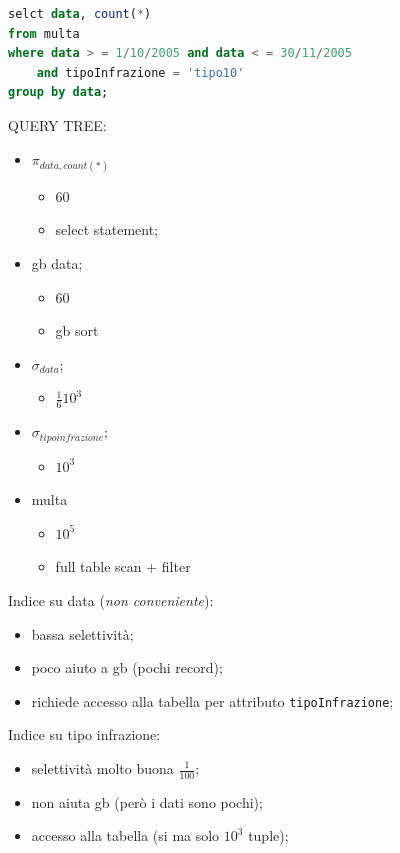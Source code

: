 \documentclass[12pt]{article}
\begin{document}
\begin{example}{}{}
\begin{lstlisting}[language=sql]
selct data, count(*)
from multa
where data > = 1/10/2005 and data < = 30/11/2005
    and tipoInfrazione = 'tipo10'
group by data;
\end{lstlisting} 
    QUERY TREE:
    \begin{itemize}
        \item $\pi_{data, count(*)}$
            \begin{itemize}
                \item 60
                \item select statement;
            \end{itemize}
        \item gb data;
            \begin{itemize}
                \item 60
                \item gb sort
            \end{itemize}
        \item $\sigma_{data}$;
            \begin{itemize}
                \item $\frac{1}{6} 10^{3}$
            \end{itemize}
        \item $\sigma_{tipoinfrazione}$;
            \begin{itemize}
                \item $10^{3}$
            \end{itemize}
        \item multa
            \begin{itemize}
                \item $10^{5}$
                \item full table scan + filter
            \end{itemize}
    \end{itemize}


    Indice su data (\emph{non conveniente}):
    \begin{itemize}
        \item bassa selettivit\`a;
        \item poco aiuto a gb (pochi record);
        \item richiede accesso alla tabella per attributo \texttt{tipoInfrazione};
    \end{itemize}
    Indice su tipo infrazione:
    \begin{itemize}
        \item selettivit\`a molto buona $\frac{1}{100}$;
        \item non aiuta gb (per\`o i dati sono pochi);
        \item accesso alla tabella (si ma solo $10^{3}$ tuple);
    \end{itemize}


\end{example}
\end{document}
